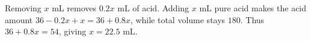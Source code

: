 Removing $x$ mL removes $0.2x$ mL of acid. Adding $x$ mL pure acid makes the acid amount $36-0.2x+x=36+0.8x$, while total volume stays $180$. Thus $36+0.8x=54$, giving $\boxed{x=22.5\text{ mL}}$.
